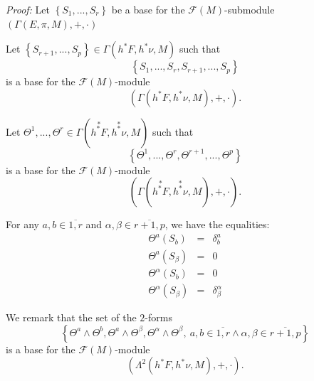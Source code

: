 \documentclass[11pt]{article}
\begin{document}
\emph{Proof: }Let $\left\{ S_{1},...,S_{r}\right\} $ be a base for the $%
\mathcal{F}\left( M\right) $-submodule $\left( \Gamma \left( E,\pi ,M\right)
,+,\cdot \right) $

Let $\left\{ S_{r+1},...,S_{p}\right\} \in \Gamma \left( h^{\ast }F,h^{\ast
}\nu ,M\right) $ such that
\begin{equation*}
\left\{ S_{1},...,S_{r},S_{r+1},...,S_{p}\right\}
\end{equation*}%
is a base for the $\mathcal{F}\left( M\right) $-module
\begin{equation*}
\left( \Gamma \left( h^{\ast }F,h^{\ast }\nu ,M\right) ,+,\cdot \right) .
\end{equation*}

Let $\Theta ^{1},...,\Theta ^{r}\in \Gamma \left( \overset{\ast }{h^{\ast }F}%
,\overset{\ast }{h^{\ast }\nu },M\right) $ such that
\begin{equation*}
\left\{ \Theta ^{1},...,\Theta ^{r},\Theta ^{r+1},...,\Theta ^{p}\right\}
\end{equation*}
is a base for the $\mathcal{F}\left( M\right) $-module
\begin{equation*}
\left( \Gamma \left( \overset{\ast }{h^{\ast }F},\overset{\ast }{h^{\ast
}\nu },M\right) ,+,\cdot \right) .
\end{equation*}

For any $a,b\in \overline{1,r}$ and $\alpha ,\beta \in \overline{r+1,p}$, we
have the equalities:%
\begin{equation*}
\begin{array}{ccc}
\Theta ^{a}\left( S_{b}\right) & = & \delta _{b}^{a} \\
\Theta ^{a}\left( S_{\beta }\right) & = & 0 \\
\Theta ^{\alpha }\left( S_{b}\right) & = & 0 \\
\Theta ^{\alpha }\left( S_{\beta }\right) & = & \delta _{\beta }^{\alpha }%
\end{array}%
\end{equation*}

We remark that the set of the $2$-forms%
\begin{equation*}
\left\{ \Theta ^{a}\wedge \Theta ^{b},\Theta ^{a}\wedge \Theta ^{\beta
},\Theta ^{\alpha }\wedge \Theta ^{\beta },~a,b\in \overline{1,r}\wedge
\alpha ,\beta \in \overline{r+1,p}\right\}
\end{equation*}%
is a base for the $\mathcal{F}\left( M\right) $-module
\begin{equation*}
\left( \Lambda ^{2}\left( h^{\ast }F,h^{\ast }\nu ,M\right) ,+,\cdot \right)
.
\end{equation*}
\end{document}
